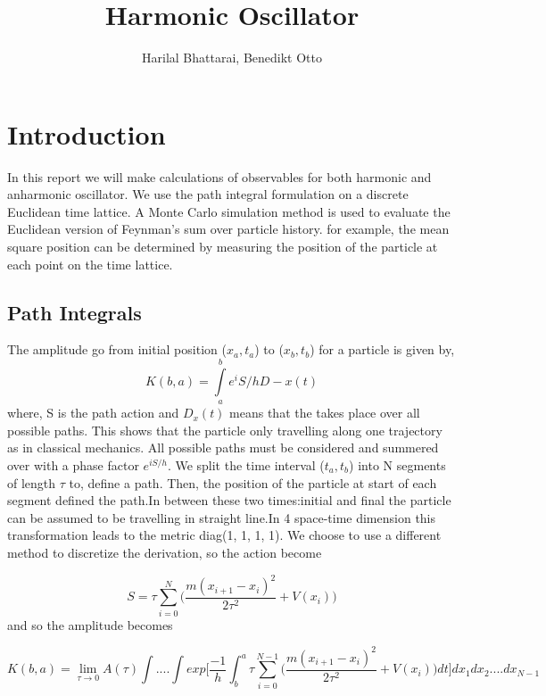 \documentclass{article}
\title{Harmonic Oscillator}
\author{Harilal Bhattarai, Benedikt Otto}
\begin{document}
	\maketitle
	\newpage
	\begin{abstract}
	\end{abstract}
	\section{Introduction}
In this report we will make calculations of observables for both harmonic and anharmonic oscillator. We use the path integral formulation on a discrete Euclidean time lattice. A Monte Carlo simulation method is used to evaluate the Euclidean version of Feynman’s sum over particle history. for example, the mean square position can be determined by measuring the position of the particle at each point on the time lattice.

\subsection{Path Integrals}
The amplitude go from initial position ($x_a, t_a$) to ($x_b, t_b$) for a particle is given by,
\begin{equation}
K(b,a)= \int\limits_{a}^{b} e^iS/h D-x(t)
\end{equation}
where, S is the path action and $D_x(t)$ means that the takes place over all possible paths. 
This shows that the particle only travelling along one trajectory as in classical mechanics. All possible paths must be considered and summered over with a phase factor $e^{iS/h}$. We split the time interval ($t_a, t_b$) into N segments of length $\tau$ to, define a path. Then, the position of the particle at start of each segment defined the path.In between these two times:initial and final the particle can be assumed to be travelling in straight line.In 4 space-time dimension this transformation leads to the metric diag(1, 1, 1, 1).
We choose to use a different method to discretize the derivation, so the action become

\begin{equation}
S= \tau\sum_{i=0}^{N}\bigg( \frac{ m(x_{i+1} -x_i)^2}{2\tau^2} + V(x_i)\bigg)
\end{equation} 
 and so the amplitude becomes

\begin{equation}
K(b,a)=\lim_{\tau \to 0} A(\tau) \int....\int exp \bigg[\frac{-1}{h} \int_{b}^{a} \tau \sum_{i=0}^{N-1} \bigg( \frac{m(x_{i+1} - x_i)^2}{2\tau^2} +V(x_i)\bigg)dt \bigg]dx_1 dx_2....dx_{N-1}
\end{equation}
\end{document}

